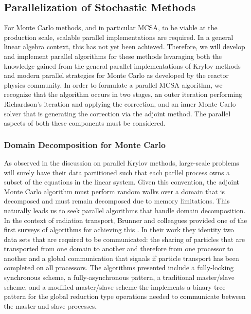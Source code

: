 \subsection{Parallelization of Stochastic Methods}
\label{subsec:parallel_stochastic_methods}
For Monte Carlo methods, and in particular MCSA, to be viable at the
production scale, scalable parallel implementations are required. In a
general linear algebra context, this has not yet been
achieved. Therefore, we will develop and implement parallel algorithms
for these methods levaraging both the knowledge gained from the
general parallel implementations of Krylov methods and modern parallel
strategies for Monte Carlo as developed by the reactor physics
community. In order to formulate a parallel MCSA algorithm, we
recognize that the algorithm occurs in two stages, an outer iteration
performing Richardson's iteration and applying the correction, and an
inner Monte Carlo solver that is generating the correction via the
adjoint method. The parallel aspects of both these components must be
considered.

\subsubsection{Domain Decomposition for Monte Carlo}
\label{subsubsec:msod}
As observed in the discussion on parallel Krylov methods, large-scale
problems will surely have their data partitioned such that each
parllel process owns a subset of the equations in the linear
system. Given this convention, the adjoint Monte Carlo algorithm must
perform random walks over a domain that is decomposed and must remain
decomposed due to memory limitations. This naturally leads us to seek
parallel algorithms that handle domain decomposition. In the context
of radiation transport, Brunner and colleagues provided one of the
first surveys of algorithms for achieving this
\citep{brunner_comparison_2006}. In their work they identity two data
sets that are required to be communicated: the sharing of particles
that are transported from one domain to another and therefore from one
processor to another and a global communication that signals if
particle transport has been completed on all processors. The
algorithms presented include a fully-locking synchronous scheme, a
fully-asynchronous pattern, a traditional master/slave scheme, and a
modified master/slave scheme the implements a binary tree pattern for
the global reduction type operations needed to communicate between the
master and slave processes.

